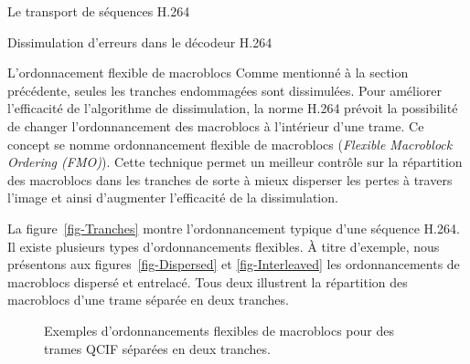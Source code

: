 \documentclass[letterpaper, twoside, 12pt,memoire]{thETS}
\newcommand{\ang}[1]{(\textit{#1})}
\newcommand{\fig}[1]{figure~\ref{#1}}
\begin{document}
\begin{chapter}{Le transport de séquences H.264}
\begin{section}{Dissimulation d'erreurs dans le décodeur H.264}
\end{section}

\begin{section}{L'ordonnacement flexible de macroblocs}
\label{sect-FMO}
Comme mentionné à la section précédente, seules les tranches endommagées sont
dissimulées. Pour améliorer l'efficacité de l'algorithme de dissimulation, la
norme H.264 prévoit la possibilité de changer l'ordonnancement des macroblocs à
l'intérieur d'une trame. Ce concept se nomme ordonnancement flexible de
macroblocs \ang{Flexible Macroblock Ordering (FMO)}. Cette technique permet un
meilleur contrôle sur la répartition des macroblocs dans les tranches de sorte
à mieux disperser les pertes à travers l'image et ainsi d'augmenter l'efficacité de
la dissimulation.

La \fig{fig-Tranches} montre l'ordonnancement typique d'une séquence H.264. Il
existe plusieurs types d'ordonnancements flexibles. À titre d'exemple, nous
présentons aux figures~\ref{fig-Dispersed} et \ref{fig-Interleaved} les
ordonnancements de macroblocs dispersé et entrelacé. Tous deux illustrent la
répartition des macroblocs d'une trame séparée en deux tranches.

\begin{figure}[htb]
\caption{Exemples d'ordonnancements flexibles de macroblocs pour des trames
QCIF séparées en deux tranches.}
\label{fig-FrameCopy}
\end{figure}


\end{section}
\end{chapter}
\end{document}
